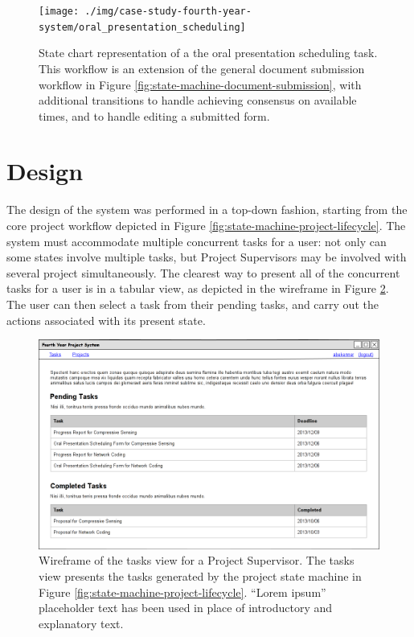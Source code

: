 \begin{figure}[!htbp]
\centering \texttt{[image: ./img/case-study-fourth-year-system/oral\_presentation\_scheduling]}
\caption{State chart representation of a the oral presentation scheduling task. This workflow is an extension of the general document submission workflow in Figure \ref{fig:state-machine-document-submission}, with additional transitions to handle achieving consensus on available times, and to handle editing a submitted form.}
\label{fig:state-machine-oral-presentation-scheduling}
\end{figure}


\FloatBarrier

\section{Design}
\label{sec:4ys-design}

The design of the system was performed in a top-down fashion, starting from the core project workflow depicted in Figure \ref{fig:state-machine-project-lifecycle}. The system must accommodate multiple concurrent tasks for a user: not only can some states involve multiple tasks, but Project Supervisors may be involved with several project simultaneously. The clearest way to present all of the concurrent tasks for a user is in a tabular view, as depicted in the wireframe in Figure \ref{fig:wireframe-tasks-view}. The user can then select a task from their pending tasks, and carry out the actions associated with its present state.

\begin{figure}[!htbp]
\centering \includegraphics[width=6in]{./img/case-study-fourth-year-system/supervisor-tasks-view_wireframe}
\caption{Wireframe of the tasks view for a Project Supervisor. The tasks view presents the tasks generated by the project state machine in Figure \ref{fig:state-machine-project-lifecycle}. ``Lorem ipsum'' placeholder text has been used in place of introductory and explanatory text.}
\label{fig:wireframe-tasks-view}
\end{figure}

